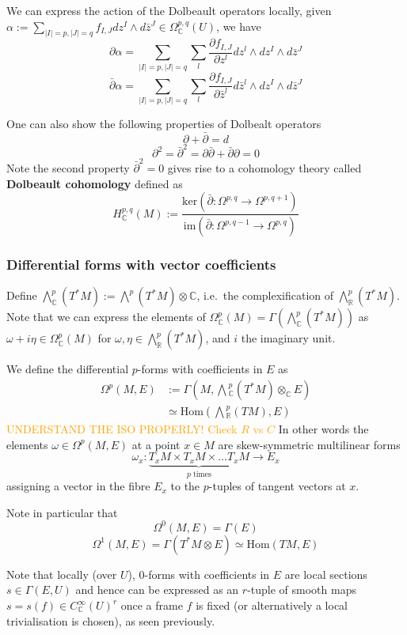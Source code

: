 \documentclass[a4paper]{article}
\theoremstyle{definition} \newtheorem*{definition}{Definition}
\theoremstyle{definition} \newtheorem*{definitions}{Definitions}
\theoremstyle{plain} \newtheorem{theorem}{Theorem}[section]
\theoremstyle{plain} \newtheorem{proposition}[theorem]{Proposition}
\theoremstyle{plain} \newtheorem{corollary}[theorem]{Corollary}
\theoremstyle{plain} \newtheorem{lemma}[theorem]{Lemma}
\theoremstyle{plain} \newtheorem{example}[theorem]{Example}
\newcommand{\understandBetter}[1]{\textcolor{orange}{#1}}
\newcommand{\defn}[1]{\textbf{#1}}
\newcommand{\realnos}{\mathbb{R}}
\newcommand{\complexnos}{\mathbb{C}}
\newcommand{\smoothCmaps}{C^\infty_\complexnos (U)}
\newcommand{\Hom}{\text{Hom}}
\begin{document}
We can express the action of the Dolbeault operators locally, given $\alpha := \sum_{|I|=p, |J|=q} f_{I,J} dz^I \wedge d\bar{z}^J \in \Omega^{p,q}_\complexnos(U)$, we have
$$\partial \alpha = \sum_{|I|=p, |J|=q} \sum_l \frac{\partial f_{I,J}}{\partial z^l} dz^l\wedge dz^I \wedge d\bar{z}^J$$
$$\bar{\partial} \alpha = \sum_{|I|=p, |J|=q} \sum_l \frac{\partial f_{I,J}}{\partial \bar{z}^l} d\bar{z}^l\wedge dz^I \wedge d\bar{z}^J$$

One can also show the following properties of Dolbealt operators
$$\partial +\bar{\partial} = d$$
$$\partial^2 = \bar{\partial}^2 = \partial\bar{\partial} + \bar{\partial}\partial = 0 $$
Note the second property $\bar{\partial}^2=0$ gives rise to a cohomology theory called \defn{Dolbeault cohomology} defined as
$$H^{p,q}_\complexnos (M) := \frac{\text{ker}(\bar{\partial}:\Omega^{p,q}\to \Omega^{p, q+1})}{\text{im}(\bar{\partial}:\Omega^{p,q-1}\to \Omega^{p, q})}$$

\subsubsection{Differential forms with vector coefficients}
Define $\bigwedge^p_\complexnos(T^\ast M):=\bigwedge^p (T^\ast M)\otimes \complexnos$, i.e.\ the complexification of $\bigwedge^p_\realnos(T^\ast M)$. Note that we can express the elements of $\Omega^p_\complexnos(M)=\Gamma(\bigwedge^p_\complexnos(T^\ast M))$ as $\omega+i\eta \in \Omega^p_\complexnos(M)$ for $\omega, \eta \in \bigwedge^p_\realnos(T^\ast M)$, and $i$ the imaginary unit. 

We define the differential $p$-forms with coefficients in $E$ as 
\begin{align*}
\Omega^p(M, E) & :=\Gamma(M, \bigwedge {}^p_\complexnos(T^\ast M) \otimes_\complexnos E) \\
& \simeq \Hom(\bigwedge {}^p_\realnos (TM), E)
\end{align*}
\understandBetter{UNDERSTAND THE ISO PROPERLY! Check $R$ vs $C$}
In other words the elements $\omega\in \Omega^p(M, E)$ at a point $x\in M$ are skew-symmetric multilinear forms 
$$\omega_x:\underbrace{T_xM\times T_xM\times \ldots T_xM}_{p \text{ times}} \to E_x$$
assigning a vector in the fibre $E_x$ to the $p$-tuples of tangent vectors at $x$. 

Note in particular that 
$$\Omega^0(M, E) = \Gamma(E)$$
$$\Omega^1(M, E) = \Gamma(T^\ast M \otimes E) \simeq \Hom(TM, E)$$

Note that locally (over $U$),  $0$-forms with coefficients in $E$ are local sections $s\in \Gamma(E, U)$ and hence can be expressed as an $r$-tuple of smooth maps $s=s(f)\in \smoothCmaps^r$ once a frame $f$ is fixed (or alternatively a local trivialisation is chosen),  as seen previously.  
\end{document}
